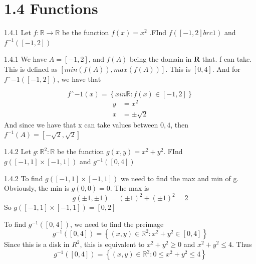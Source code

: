 \documentclass[a4paper,norsk]{article}
\renewcommand{\geq}{\geqslant}
\renewcommand{\leq}{\leqslant}
\begin{document}
\section*{1.4 Functions}


\begin{oppgavebox}{1.4.1}{}
Let $ f: \mathbb{R} \rightarrow \mathbb{R} $ be the function $ f(x) = x^2 $ .FInd $ f \left( \left[ -1,2 \right] brc1 \right)  $ and $ f^{-1} \left( \left[ -1, 2 \right]  \right)  $ 

\begin{proofbox}{1.4.1}{}
  We have $ A = \left[ -1, 2 \right]  $, and $ f \left( A \right)  $ being the domain in $ \mathbf{R} $  that. f can take. This is defined as $ \left[ min \left( f(A) \right), max \left( f(A) \right)   \right]  $. This is $ \left[ 0, 4 \right]  $. And for $ f ˆ{-1} \left( \left[ -1, 2 \right]  \right)  $, we have that 

  \[
      fˆ{-1}(x) = \left\{ x in \mathbb{R} : f(x) \in \left[ -1,2 \right]  \right\} 
  \]
  \begin{align*}
    y&=x^2  \\
    x &=\pm \sqrt{ 2 }
  \end{align*}
  And since we have that x can take values between $ 0, 4 $, then $ f^{-1} (A) = \left[ - \sqrt{ 2 }, \sqrt{ 2 } \right]  $ 
\end{proofbox}
\end{oppgavebox}


\begin{oppgavebox}{1.4.2}{}
Let $ g: \mathbb{R}^2: \mathbb{R} $ be the function $ g \left( x, y \right)  = x^2+y^2 $. FInd $ g \left( \left[ -1, 1 \right] \times \left[ -1, 1 \right]   \right)  $ and $ g^{-1} \left( \left[ 0, 4 \right]  \right)  $ 

\begin{proofbox}{1.4.2}{}
  To find $ g \left( \left[ -1, 1 \right] \times \left[ -1,  1 \right]   \right)  $ we need to find the max and min of g. Obviously, the min is $ g(0, 0) = 0 $. The max is 
  \[
      g(\pm 1, \pm 1) = \left( \pm 1 \right)^2 + \left( \pm 1 \right)  ^2 = 2
  \]
   So $ g \left( \left[ -1, 1 \right] \times \left[ -1 ,1 \right]   \right) = \left[ 0, 2 \right]  $ 

  To find $ g ^{-1} \left( \left[ 0, 4 \right]  \right)  $,  we need to find the preimage
  \[
      g^{-1} \left( \left[ 0, 4 \right]  \right) = \left\{ \left( x, y \right) \in \mathbb{R}^2 : x^2 + y^2 \in \left[ 0, 4 \right]   \right\} 
  \]
  Since this is a disk in $ R^2 $, this is equivalent to $ x^2+y^2 \geq 0 $ and $ x^2+y^2 \leq 4 $. Thus
  \[
      g^{-1} \left( \left[ 0,  4 \right]  \right) = \left\{ \left( x, y \right) \in \mathbb{R}^2 : 0 \leq x^2+y^2 \leq 4  \right\} 
  \]
\end{proofbox}
\end{oppgavebox}
\end{document}
